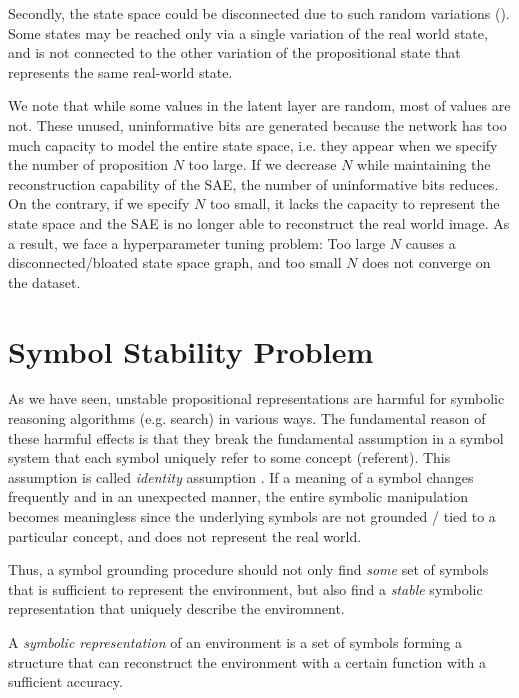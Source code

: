 Secondly, the state space could be disconnected due to such random variations ().
Some states may be reached only via a single variation of the real world state, and is not connected to the
other variation of the propositional state that represents the same real-world state.

We note that while some values in the latent layer are random, most of values are not.
These unused, uninformative bits are generated because the network has too much capacity to 
model the entire state space, i.e. they appear when we specify the number of proposition $N$ too large.
If we decrease $N$ while maintaining the reconstruction capability of the SAE, the number of uninformative bits
reduces.
On the contrary, if we specify $N$ too small, it lacks the capacity to represent the state space
and the SAE is no longer able to reconstruct the
real world image.
As a result, we face a hyperparameter tuning problem: Too large $N$ causes a disconnected/bloated state space graph,
and too small $N$ does not converge on the dataset.

\section{Symbol Stability Problem}

As we have seen, unstable propositional representations are harmful for symbolic reasoning algorithms (e.g. search)
in various ways.
The fundamental reason of these harmful effects is that they break the fundamental assumption in a symbol system
that each symbol uniquely refer to some concept (referent). This assumption is called \emph{identity} assumption \cite{}.
If a meaning of a symbol changes frequently and in an unexpected manner, the entire symbolic manipulation becomes meaningless
since the underlying symbols are not grounded / tied to a particular concept, and does not represent the real world.

Thus, a symbol grounding procedure should not only find \emph{some} set of symbols that is sufficient to represent the
environment, but also find a \emph{stable} symbolic representation that uniquely describe the enviromnent.

\begin{defi}
A \emph{symbolic representation} of an environment is a set of symbols forming a structure
that can reconstruct the environment with a certain function with a sufficient accuracy.
\end{defi}

